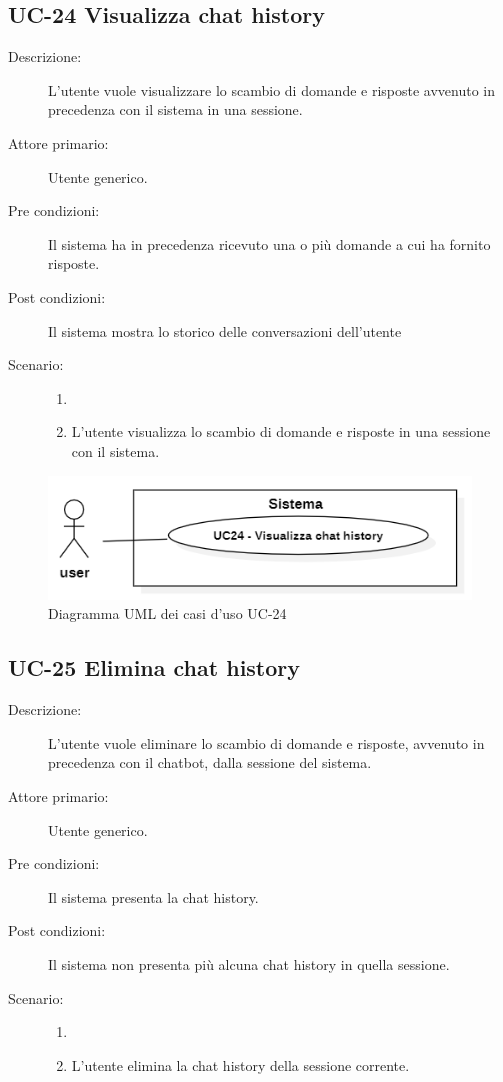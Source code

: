 \subsection{UC-24 Visualizza chat history}
\begin{description}
    \item[Descrizione:] L'utente vuole visualizzare lo scambio di domande e risposte avvenuto in precedenza con il sistema in una sessione.
    \item[Attore primario:] Utente generico.
    \item[Pre condizioni:] Il sistema ha in precedenza ricevuto una o più domande a cui ha fornito risposte.
    \item[Post condizioni:] Il sistema mostra lo storico delle conversazioni dell'utente
    \item[Scenario:]
    \begin{enumerate}
        \item[]
        \item L'utente visualizza lo scambio di domande e risposte in una sessione con il sistema.
    \end{enumerate}
    
\end{description} 

\begin{figure}[H]
    \centering
    \includegraphics[width=0.9\linewidth]{UC24.png} %
    \caption{Diagramma UML dei casi d'uso UC-24}
    \label{fig:UC28-29}
\end{figure}

\subsection{UC-25 Elimina chat history}
\begin{description}
    \item[Descrizione:] L'utente vuole eliminare lo scambio di domande e risposte, avvenuto in precedenza con il chatbot, dalla sessione del sistema.
    \item[Attore primario:] Utente generico.
    \item[Pre condizioni:] Il sistema presenta la chat history.
    \item[Post condizioni:] Il sistema non presenta più alcuna chat history in quella sessione.
    \item[Scenario:]
    \begin{enumerate}
        \item[]
        \item L'utente elimina la chat history della sessione corrente.
    \end{enumerate}
\end{description}


